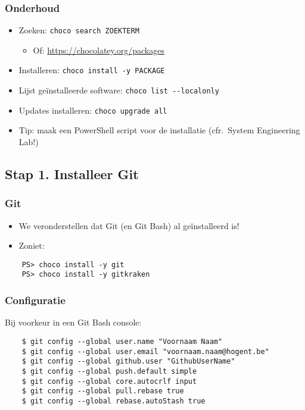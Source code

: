 \documentclass[aspectratio=169]{beamer}
\begin{document}
\begin{frame}[fragile]
  \frametitle{Onderhoud}

  \begin{itemize}
    \item Zoeken: \verb|choco search ZOEKTERM|
    \begin{itemize}
      \item Of: \url{https://chocolatey.org/packages}
    \end{itemize}
    \item Installeren: \verb|choco install -y PACKAGE|
    \item Lijst geïnstalleerde software: \verb|choco list --localonly|
    \item Updates installeren: \verb|choco upgrade all|
    \item Tip: maak een PowerShell script voor de installatie (cfr.\ System Engineering Lab!)
  \end{itemize}

\end{frame}

\subsection{Stap 1. Installeer Git}

\begin{frame}[fragile]
  \frametitle{Git}

  \begin{itemize}
    \item We veronderstellen dat Git (en Git Bash) al geïnstalleerd is!
    \item Zoniet:
  \end{itemize}

  \begin{verbatim}
    PS> choco install -y git
    PS> choco install -y gitkraken
  \end{verbatim}
\end{frame}

\begin{frame}[fragile]
  \frametitle{Configuratie}

  Bij voorkeur in een Git Bash console:

  \begin{verbatim}
    $ git config --global user.name "Voornaam Naam"
    $ git config --global user.email "voornaam.naam@hogent.be"
    $ git config --global github.user "GithubUserName"
    $ git config --global push.default simple
    $ git config --global core.autocrlf input
    $ git config --global pull.rebase true
    $ git config --global rebase.autoStash true
  \end{verbatim}

\end{frame}
\end{document}
